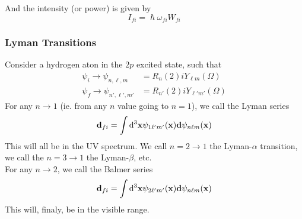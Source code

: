 \documentclass[a4paper]{article}
\begin{document}
And the intensity (or power) is given by
\[
	I_{fi} = \hslash\omega_{fi}W_{fi}
\]

\subsubsection{Lyman Transitions}
Consider a hydrogen aton in the $2p$ excited state, such that
\begin{align*}
	\psi_i \to \psi_{n,\ell,m} &= R_n(2)iY_{\ell m}(\Omega)\\
	\psi_f \to \psi_{n',\ell',m'} &= R_{n'}(2)iY_{\ell'm'}(\Omega)
\end{align*}
For any $n\to 1$ (ie. from any $n$ value going to $n=1$), we call the
Lyman series
\[
	\boldsymbol{\mathbf{d}}_{fi} = \int \mathrm{d}^3\boldsymbol{\mathbf{x}} \psi_{1\ell'm'}(\boldsymbol{\mathbf{x}})
		\boldsymbol{\mathbf{d}}\psi_{n\ell m}(\boldsymbol{\mathbf{x}})
\]
This will all be in the UV spectrum. We call $n = 2 \to 1$ the Lyman-$\alpha$
transition, we call the $n = 3 \to 1$ the Lyman-$\beta$, etc.\\
For any $n\to 2$, we call the Balmer series
\[
	\boldsymbol{\mathbf{d}}_{fi} = \int \mathrm{d}^3\boldsymbol{\mathbf{x}} \psi_{2\ell'm'}(\boldsymbol{\mathbf{x}})
		\boldsymbol{\mathbf{d}}\psi_{n\ell m}(\boldsymbol{\mathbf{x}})
\]
This will, finaly, be in the visible range.
\end{document}
